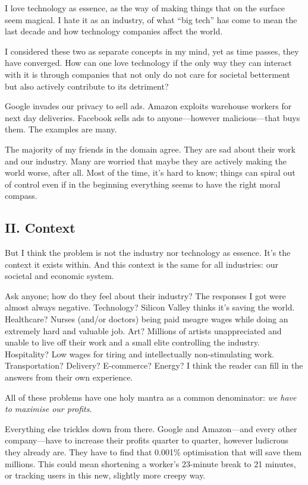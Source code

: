 I love technology as essence, as the way of making things that on the surface seem magical. I hate it as an industry, of what “big tech” has come to mean the last decade and how technology companies affect the world.

I considered these two as separate concepts in my mind, yet as time passes, they have converged. How can one love technology if the only way they can interact with it is through companies that not only do not care for societal betterment but also actively contribute to its detriment?

Google invades our privacy to sell ads. Amazon exploits warehouse workers for next day deliveries. Facebook sells ads to anyone—however malicious—that buys them. The examples are many.

The majority of my friends in the domain agree. They are sad about their work and our industry. Many are worried that maybe they are actively making the world worse, after all. Most of the time, it’s hard to know; things can spiral out of control even if in the beginning everything seems to have the right moral compass.

\subsection{II. Context}

But I think the problem is not the industry nor technology as essence. It’s the context it exists within. And this context is the same for all industries: our societal and economic system.

Ask anyone; how do they feel about their industry? The responses I got were almost always negative. Technology? Silicon Valley thinks it’s saving the world. Healthcare? Nurses (and/or doctors) being paid meagre wages while doing an extremely hard and valuable job. Art? Millions of artists unappreciated and unable to live off their work and a small elite controlling the industry. Hospitality? Low wages for tiring and intellectually non-stimulating work. Transportation? Delivery? E-commerce? Energy? I think the reader can fill in the answers from their own experience.

All of these problems have one holy mantra as a common denominator: \emph{we have to maximise our profits}.

Everything else trickles down from there. Google and Amazon—and every other company—have to increase their profits quarter to quarter, however ludicrous they already are. They have to find that 0.001\% optimisation that will save them millions. This could mean shortening a worker’s 23-minute break to 21 minutes, or tracking users in this new, slightly more creepy way.


